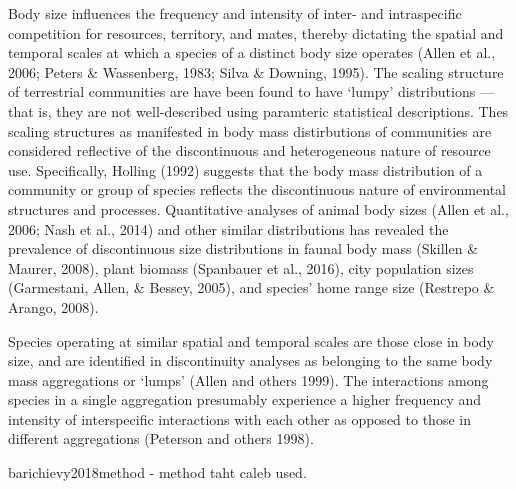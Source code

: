 \documentclass[12pt,twoside,openany]{reedthesis}
\begin{document}
Body size influences the frequency and intensity of inter- and intraspecific competition for resources, territory, and mates, thereby dictating the spatial and temporal scales at which a species of a distinct body size operates (Allen et al., 2006; Peters \& Wassenberg, 1983; Silva \& Downing, 1995). The scaling structure of terrestrial communities are have been found to have `lumpy' distributions --- that is, they are not well-described using paramteric statistical descriptions. Thes scaling structures as manifested in body mass distirbutions of communities are considered reflective of the discontinuous and heterogeneous nature of resource use. Specifically, Holling (1992) suggests that the body mass distribution of a community or group of species reflects the discontinuous nature of environmental structures and processes. Quantitative analyses of animal body sizes (Allen et al., 2006; Nash et al., 2014) and other similar distributions has revealed the prevalence of discontinuous size distributions in faunal body mass (Skillen \& Maurer, 2008), plant biomass (Spanbauer et al., 2016), city population sizes (Garmestani, Allen, \& Bessey, 2005), and species' home range size (Restrepo \& Arango, 2008).

Species operating at similar spatial and temporal scales are those close in body size, and are identified in discontinuity analyses as belonging to the same body mass aggregations or `lumps' (Allen and others 1999). The interactions among species in a single aggregation presumably experience a higher frequency and intensity of interspecific interactions with each other as opposed to those in different aggregations (Peterson and others 1998).

barichievy2018method - method taht caleb used.
\end{document}
